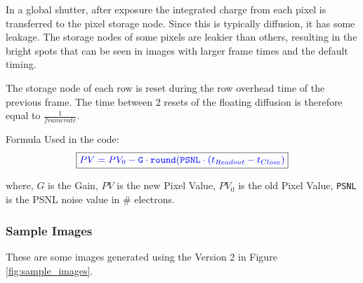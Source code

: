 \documentclass[../../main.tex]{subfiles}
\begin{document}
In a global shutter, after exposure the integrated charge from each pixel is transferred to the pixel storage node. Since this is typically diffusion, it has some leakage. The storage nodes of some pixels are leakier than others, resulting in the bright spots that can be seen in images with larger frame times and the default timing.

The storage node of each row is reset during the row overhead time of the previous frame. The time between 2 resets of the floating diffusion is therefore equal to $\frac{1}{frame rate}$.

Formula Used in the code:
\begin{equation}
    \boxed{ \color{blue} PV = PV_0 - \texttt{G} \cdot \texttt{round}(\texttt{PSNL} \cdot (t_{Readout} - t_{Close}) \color{black}}
\end{equation}

where, $G$ is the Gain, $PV$ is the new Pixel Value, $PV_0$ is the old Pixel Value, \texttt{PSNL} is the PSNL noise value in \# electrons.


 
 
\subsubsection{Sample Images}
These are some images generated using the \SISM Version 2 in Figure \ref{fig:sample_images}.
\end{document}
